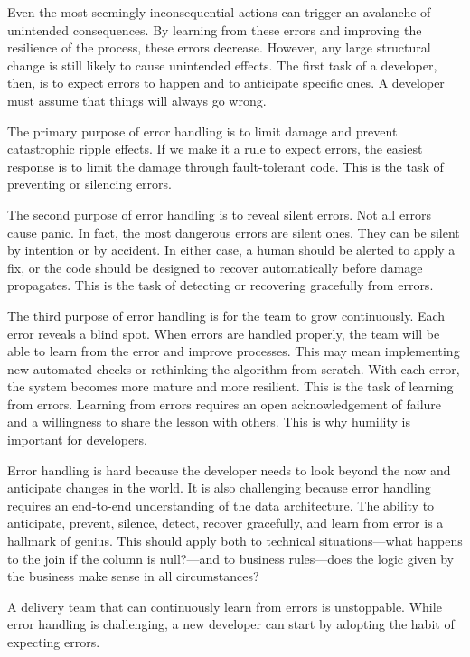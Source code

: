\documentclass[10pt,openany,10pt]{book}
\begin{document}
Even the most seemingly inconsequential actions can trigger an avalanche
of unintended consequences. By learning from these errors and improving
the resilience of the process, these errors decrease. However, any large
structural change is still likely to cause unintended effects. The first
task of a developer, then, is to expect errors to happen and to
anticipate specific ones. A developer must assume that things will
always go wrong.

The primary purpose of error handling is to limit damage and prevent
catastrophic ripple effects. If we make it a rule to expect errors, the
easiest response is to limit the damage through fault-tolerant code.
This is the task of preventing or silencing errors.

The second purpose of error handling is to reveal silent errors. Not all
errors cause panic. In fact, the most dangerous errors are silent ones.
They can be silent by intention or by accident. In either case, a human
should be alerted to apply a fix, or the code should be designed to
recover automatically before damage propagates. This is the task of
detecting or recovering gracefully from errors.

The third purpose of error handling is for the team to grow
continuously. Each error reveals a blind spot. When errors are handled
properly, the team will be able to learn from the error and improve
processes. This may mean implementing new automated checks or rethinking
the algorithm from scratch. With each error, the system becomes more
mature and more resilient. This is the task of learning from errors.
Learning from errors requires an open acknowledgement of failure and a
willingness to share the lesson with others. This is why humility is
important for developers.

Error handling is hard because the developer needs to look beyond the
now and anticipate changes in the world. It is also challenging because
error handling requires an end-to-end understanding of the data
architecture. The ability to anticipate, prevent, silence, detect,
recover gracefully, and learn from error is a hallmark of genius. This
should apply both to technical situations---what happens to the join if
the column is null?---and to business rules---does the logic given by
the business make sense in all circumstances?

A delivery team that can continuously learn from errors is unstoppable.
While error handling is challenging, a new developer can start by
adopting the habit of expecting errors.
\end{document}
